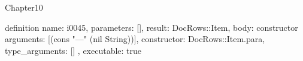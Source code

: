 \begin{lexlean}{Chapter10}
\begin{semanticmodule}
definition{
  name: i0045,
  parameters: [],
  result: DocRows::Item,
  body: constructor{
    arguments: [(cons "---" (nil String))],
    constructor: DocRows::Item.para,
    type_arguments: []
  },
  executable: true
}
\end{semanticmodule}
\end{lexlean}
